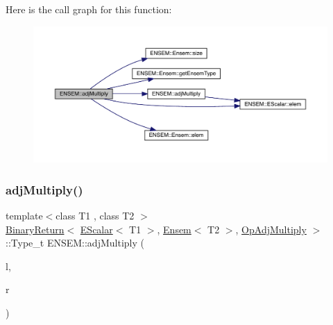 Here is the call graph for this function\+:\nopagebreak
\begin{figure}[H]
\begin{center}
\leavevmode
\includegraphics[width=350pt]{d1/d9e/group__eensem_ga357579ea9af81c46ec906486ce9f2a52_cgraph}
\end{center}
\end{figure}
\mbox{\label{group__eensem_ga6ec27b863a98d9cf552c2a0194dc53f5}} 
\subsubsection{\texorpdfstring{adjMultiply()}{adjMultiply()}\hspace{0.1cm}{\footnotesize\ttfamily [3/3]}}
{\footnotesize\ttfamily template$<$class T1 , class T2 $>$ \\
\mbox{\hyperlink{structENSEM_1_1BinaryReturn}{Binary\+Return}}$<$ \mbox{\hyperlink{classENSEM_1_1EScalar}{E\+Scalar}}$<$ T1 $>$, \mbox{\hyperlink{classENSEM_1_1Ensem}{Ensem}}$<$ T2 $>$, \mbox{\hyperlink{structENSEM_1_1OpAdjMultiply}{Op\+Adj\+Multiply}} $>$\+::Type\+\_\+t E\+N\+S\+E\+M\+::adj\+Multiply (\begin{DoxyParamCaption}\item[{const \mbox{\hyperlink{classENSEM_1_1EScalar}{E\+Scalar}}$<$ T1 $>$ \&}]{l,  }\item[{const \mbox{\hyperlink{classENSEM_1_1Ensem}{Ensem}}$<$ T2 $>$ \&}]{r }\end{DoxyParamCaption})\hspace{0.3cm}{\ttfamily [inline]}}

